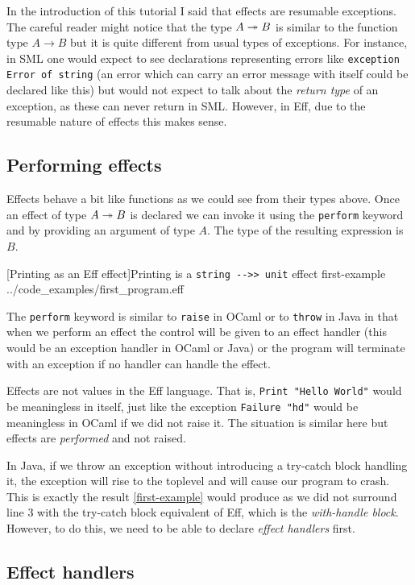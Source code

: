 \documentclass[class=article, crop=false]{standalone}
\begin{document}
In the introduction of this tutorial I said that effects are resumable
exceptions. The careful reader might notice that the type $A \twoheadrightarrow B$ is similar
to the function type $A \to B$ but it is quite different from usual types of
exceptions. For instance, in SML \cite{milner1997definition} one would expect
to see declarations representing errors like
\lstinline{exception Error of string} (an error which can carry an error message
with itself could be declared like this) but would not expect to talk about the
\emph{return type} of an exception, as these can never return in SML. However,
in Eff, due to the resumable nature of effects this makes sense.

\subsection{Performing effects}

Effects behave a bit like functions as we could see from their types above.
Once an effect of type $A \twoheadrightarrow B$ is declared we can invoke it
using the \lstinline{perform} keyword and by providing an argument of type $A$.
The type of the resulting expression is $B$.

{[Printing as an Eff effect]Printing is a \lstinline|string -->> unit| effect}
{first-example}
{../code_examples/first_program.eff}

The \lstinline{perform} keyword is similar to \lstinline|raise| in OCaml or to
\lstinline|throw| in Java in that when we perform an effect the control will be
given to an effect handler (this would be an exception handler in OCaml or Java)
or the program will terminate with an exception if no handler can handle the
effect.

Effects are not values in the Eff language. That is,
\lstinline{Print "Hello World"} would be meaningless
in itself, just like the exception \lstinline{Failure "hd"} would be meaningless
in OCaml if we did not raise it. The situation is similar here but effects are
\emph{performed} and not raised.

In Java, if we throw an exception without introducing a try-catch block handling
it, the exception will rise to the toplevel and will cause our program to crash.
This is exactly the result \autoref{first-example} would produce as we did not
surround line 3 with the try-catch block equivalent of Eff, which is the
\emph{with-handle block}. However, to do this, we need to be able to declare
\emph{effect handlers} first.

\subsection{Effect handlers}
\end{document}
